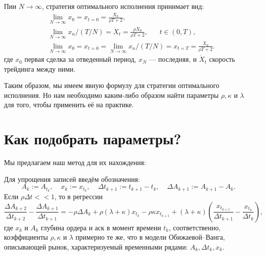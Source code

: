 \begin{theorem}
    Пии $N \rightarrow \infty$, стратегия оптимального исполнения принимает вид:
    \begin{align*}
        & \lim _{N \rightarrow \infty} x_0 = x_{t = 0} = \frac{X_0}{\rho T + 2}, \\
        & \lim _{N \rightarrow \infty} x_n / (T/N) = \dot X _t = \frac{\rho X_0}{\rho T + 2}, \;\;\;\;\;\; t \in (0, T), \\
        & \lim _{N \rightarrow \infty} x_0 = x_{t = 0} = \lim _{N \rightarrow \infty} x_n / (T/N) = x_{t=T}=  \frac{X_0}{\rho T + 2}.  %
    \end{align*}
    где $x_0$ первая сделка за отведенный период, $x_N$ --- последняя, и $\dot X _t$ скорость трейдинга между ними.
\end{theorem}

Таким образом, мы имеем явную формулу для стратегии оптимального исполнения. Но нам необходимо каким-либо образом найти
параметры $\rho, \kappa$ и $\lambda$ для того, чтобы применить её на практике. 

\section{Как подобрать параметры?}



Мы предлагаем наш метод для их нахождения: 
\begin{theorem}
    Для упрощения записей введём обозначения:
    \[
    A_k := A_{t_k}, \; \; \; \; 
    x_{k}:= x_{t_k}, \; \; \; \; 
    \Delta t_{k+1} := t_{k+1} - t_k, \; \; \; \;   
    \Delta A_{k+1} := A_{k+1} - A_k. 
    \]
        Если $\rho \Delta t << 1$, то в регрессии                                                                                                                                                                                                                                                                                                                                                                                     
        \begin{equation*}
            \frac{\Delta A_{k+2}}{\Delta t_{k+2}} - \frac{\Delta A_{k+1}}{\Delta t_{k+1}} 
        = -\rho \Delta A_k + \rho (\lambda + \kappa) x_{t_k} - \rho \kappa x_{t_{k+1}} 
        + (\lambda + \kappa) \left(\frac{x_{t_{k+1}}}{\Delta t_{k+1}} - \frac{x_{t_k}}{\Delta t_{k}}\right),
        \end{equation*}
        где $x_{k}$ и $A_{k}$ глубина ордера и аск в момент времени $t_k$, соответственно, \\

        коэффициенты $\rho, \kappa$ и $\lambda$ примерно те же, что в модели Обижаевой--Ванга, описывающей рынок,
        характеризуемый временными рядами: $A_k, \Delta t _k, x_k$.



\end{theorem}


